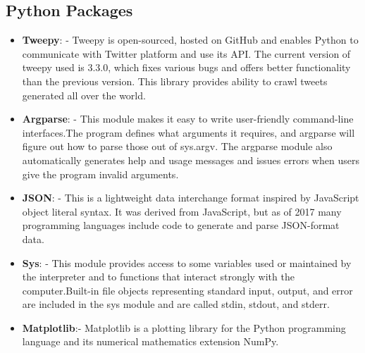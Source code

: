 \documentclass[12pt, oneside]{article}   	%
\begin{document}
\subsection{Python Packages}
\begin{itemize}
	
	\item \textbf{Tweepy}: - Tweepy is open-sourced, hosted on GitHub and enables Python to communicate with Twitter platform and use its API. The current version of tweepy used is 3.3.0,  which fixes various bugs and offers better functionality than the previous version. This library provides ability to crawl tweets generated all over the world.
	\item \textbf{Argparse}: - This module makes it easy to write user-friendly command-line interfaces.The program defines what arguments it requires, and argparse will figure out how to parse those out of sys.argv. The argparse module also automatically generates help and usage messages and issues errors when users give the program invalid arguments.
	
	\item \textbf{JSON}: - This is a lightweight data interchange format inspired by JavaScript object literal syntax. It was derived from JavaScript, but as of 2017 many programming languages include code to generate and parse JSON-format data. 
	
	\item \textbf{Sys}: - This module provides access to some variables used or maintained by the interpreter and to functions that interact strongly with the computer.Built-in file objects representing standard input, output, and error are included in the sys module and are called stdin, stdout, and stderr.
	\item \textbf{Matplotlib}:- Matplotlib is a plotting library for the Python programming language and its numerical mathematics extension NumPy. 
\end{itemize}
\end{document}
